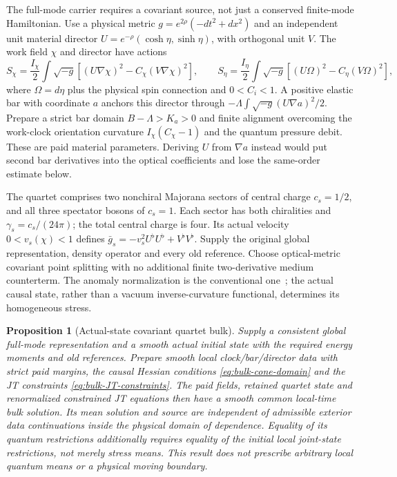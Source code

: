 \documentclass[12pt,a4paper]{article}
\newtheorem{proposition}[theorem]{Proposition}
\begin{document}
The full-mode carrier requires a covariant source, not just a conserved
finite-mode Hamiltonian. Use a physical metric $g=e^{2\rho}(-dt^2+dx^2)$
and an independent unit material director
$U=e^{-\rho}(\cosh\eta,\sinh\eta)$, with orthogonal unit $V$.
The work field $\chi$ and director have actions
\begin{equation}
 S_\chi=\frac{I_\chi}{2}\int\sqrt{-g}
       [(U\nabla\chi)^2-C_\chi(V\nabla\chi)^2],\qquad
 S_\eta=\frac{I_\eta}{2}\int\sqrt{-g}
       [(U\Omega)^2-C_\eta(V\Omega)^2],                     \label{eq:bulk-paid-fields}
\end{equation}
where $\Omega=d\eta$ plus the physical spin connection and $0<C_i<1$.
A positive elastic bar with coordinate $a$ anchors this director through
$-\Lambda\int\sqrt{-g}(U\nabla a)^2/2$.
Prepare a strict bar domain $B-\Lambda>K_a>0$ and finite alignment
overcoming the work-clock orientation curvature
$I_\chi(C_\chi-1)$ and the quantum pressure debit. These are paid
material parameters. Deriving $U$ from $\nabla a$ instead would put
second bar derivatives into the optical coefficients and lose the
same-order estimate below.

The quartet comprises two nonchiral Majorana sectors of central charge
$c_s=1/2$, and all three spectator bosons of $c_s=1$. Each sector has
both chiralities and $\gamma_s=c_s/(24\pi)$; the total central charge
is four. Its actual velocity $0<v_s(\chi)<1$ defines
$\bar g_s=-v_s^2U^\flat U^\flat+V^\flat V^\flat$.
Supply the original global representation, density operator and every
old reference. Choose optical-metric covariant point splitting with no
additional finite two-derivative medium counterterm. The anomaly
normalization is the conventional one~\cite[Section~2]{Codello2010};
the actual causal state, rather than a vacuum inverse-curvature
functional, determines its homogeneous stress.

\begin{proposition}[Actual-state covariant quartet bulk]
\label{prop:covariant-quartet-bulk}
Supply a consistent global full-mode representation and a smooth actual
initial state with the required energy moments and old references.
Prepare smooth local clock/bar/director data with strict paid margins,
the causal Hessian conditions \eqref{eq:bulk-cone-domain} and the JT
constraints \eqref{eq:bulk-JT-constraints}. The paid fields, retained
quartet state and renormalized constrained JT equations then have a
smooth common local-time bulk solution. Its mean solution and source
are independent of admissible exterior data continuations inside the
physical domain of dependence. Equality of its quantum restrictions
additionally requires equality of the initial local joint-state
restrictions, not merely stress means. This result does not prescribe
arbitrary local quantum means or a physical moving boundary.
\end{proposition}
\end{document}
